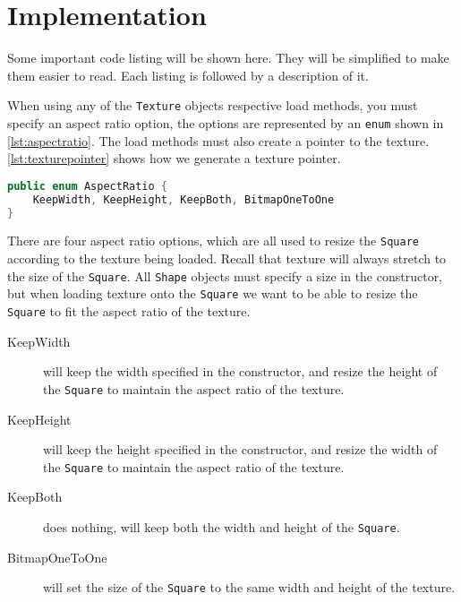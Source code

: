 \section{Implementation}

Some important code listing will be shown here. They will be simplified to make them easier to read. Each listing is followed by a description of it.

When using any of the \lstinline|Texture| objects respective load methods, you must specify an aspect ratio option, the options are represented by an \lstinline|enum| shown in \autoref{lst:aspectratio}. The load methods must also create a pointer to the texture. \autoref{lst:texturepointer} shows how we generate a texture pointer.
\begin{lstlisting}[language=java,caption={Aspect ratio enum.},label=lst:aspectratio] 
public enum AspectRatio {
    KeepWidth, KeepHeight, KeepBoth, BitmapOneToOne
}
\end{lstlisting}
There are four aspect ratio options, which are all used to resize the \lstinline|Square| according to the texture being loaded. Recall that texture will always stretch to the size of the \lstinline|Square|. All \lstinline|Shape| objects must specify a size in the constructor, but when loading texture onto the \lstinline|Square| we want to be able to resize the \lstinline|Square| to fit the aspect ratio of the texture.
\begin{description}
\item[KeepWidth] will keep the width specified in the constructor, and resize the height of the \lstinline|Square| to maintain the aspect ratio of the texture.
\item[KeepHeight] will keep the height specified in the constructor, and resize the width of the \lstinline|Square| to maintain the aspect ratio of the texture.
\item[KeepBoth] does nothing, will keep both the width and height of the \lstinline|Square|.
\item[BitmapOneToOne] will set the size of the \lstinline|Square| to the same width and height of the texture.
\end{description}

